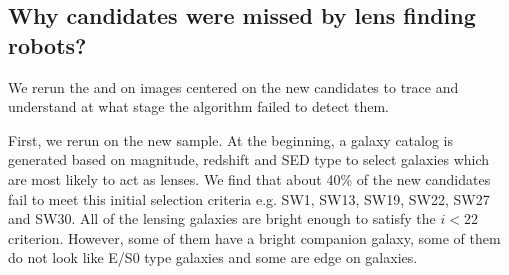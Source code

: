 \documentclass[useAMS,usenatbib,a4paper]{mn2e}
\begin{document}
\subsection{Why \sw candidates were missed by lens finding robots?}
We rerun the \rf and \af on images centered on the new \sw candidates to
trace and understand at what stage the algorithm failed to detect them.

First, we rerun \rf on the new \sw sample. At the beginning, a galaxy
catalog is generated based on magnitude, redshift and SED type
\citep[see]{Gavazzi2014} to select galaxies which are most likely to act
as lenses. We find that about 40\% of the new \sw candidates fail to
meet this initial selection criteria e.g. SW1, SW13, SW19, SW22, SW27
and SW30.  All of the lensing galaxies are bright enough to satisfy the
$i<22$ criterion. However, some of them have a bright companion galaxy,
some of them do not look like E/S0 type galaxies and some are edge on
galaxies.

\end{document}
